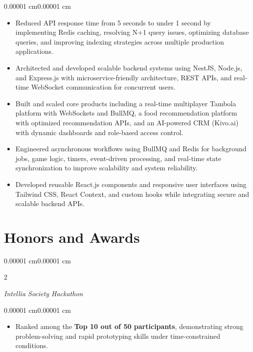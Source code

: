 \documentclass[10pt, letterpaper]{article}
\newenvironment{highlights}{
    \begin{itemize}[
        topsep=0.10 cm,
        parsep=0.10 cm,
        partopsep=0pt,
        itemsep=0.02 cm,
        leftmargin=15pt
    ]
}{
    \end{itemize}
}
\newenvironment{onecolentry}{
    \begin{adjustwidth}{0.00001 cm}{0.00001 cm}
}{
    \end{adjustwidth}
}
\newenvironment{twocolentry}[2][]{
    \onecolentry
    \def\secondColumn{#2}
    \setcolumnwidth{\fill, 4.5 cm}
    \begin{paracol}{2}
}{
    \switchcolumn \raggedleft \secondColumn
    \end{paracol}
    \endonecolentry
}
\begin{document}
\vspace{0.10cm}

\begin{onecolentry}
\begin{highlights}
\item Reduced API response time from 5 seconds to under 1 second by implementing Redis caching, resolving N+1 query issues, optimizing database queries, and improving indexing strategies across multiple production applications.
\item Architected and developed scalable backend systems using NestJS, Node.js, and Express.js with microservice-friendly architecture, REST APIs, and real-time WebSocket communication for concurrent users.
\item Built and scaled core products including a real-time multiplayer Tambola platform with WebSockets and BullMQ, a food recommendation platform with optimized recommendation APIs, and an AI-powered CRM (Kivo.ai) with dynamic dashboards and role-based access control.
\item Engineered asynchronous workflows using BullMQ and Redis for background jobs, game logic, timers, event-driven processing, and real-time state synchronization to improve scalability and system reliability.
\item Developed reusable React.js components and responsive user interfaces using Tailwind CSS, React Context, and custom hooks while integrating secure and scalable backend APIs.
\end{highlights}
\end{onecolentry}

\section{Honors and Awards}

\begin{twocolentry}{}
\textit{Intellia Society Hackathon}
\end{twocolentry}

\begin{onecolentry}
\begin{highlights}
\item Ranked among the \textbf{Top 10 out of 50 participants}, demonstrating strong problem-solving and rapid prototyping skills under time-constrained conditions.
\end{highlights}
\end{onecolentry}
\end{document}
